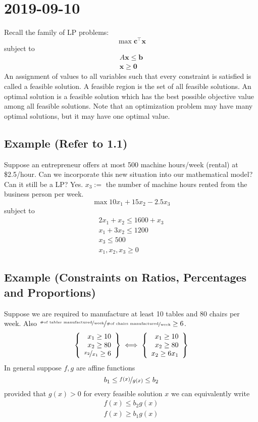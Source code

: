 \section{2019-09-10}
Recall the family of LP problems:
\[\max \mathbf{c}^\top \mathbf{x}\]
subject to
\begin{align*}
    A\mathbf{x}\le \mathbf{b}\\
    \mathbf{x}\ge \mathbf{0}
\end{align*}
An assignment of values to all variables such that every
constraint is satisfied is called a feasible solution.
A feasible region is the set of all feasible solutions.
An optimal solution is a feasible solution which has the best
possible objective value among all feasible solutions.
Note that an optimization problem may have many optimal
solutions, but it may have one optimal value.
\subsection{Example (Refer to 1.1)}
Suppose an entrepreneur offers at most 500 machine hours/week
(rental) at \$2.5/hour. Can we incorporate this new situation
into our mathematical model? Can it still be a LP? Yes.
$x_3:=$ the number of machine hours rented from the business
person per week.
\[\max 10x_1+15x_2-2.5x_3\]
subject to
\begin{align*}
    2x_1+x_2\le 1600+x_3\\
    x_1+3x_2\le 1200\\
    x_3\le 500\\
    x_1,x_2,x_3\ge 0
\end{align*}

\subsection{Example (Constraints on Ratios, Percentages and Proportions)}
Suppose we are required to manufacture at least 10 tables and
80 chairs per week. Also 
$\nicefrac{\nicefrac{\text{\#of tables manufactured}}{\text{week}}}
{\nicefrac{\text{\#of chairs manufactured}}{\text{week}}}
\ge 6$.
\[
   \left\{\begin{array}{r}
        x_1\ge 10\\
        x_2\ge 80\\
        \nicefrac{x_2}{x_1}\ge 6
    \end{array}\right\}
    \iff
    \left\{\begin{array}{r}
        x_1\ge 10\\
        x_2\ge 80\\
        x_2\ge 6x_1
    \end{array}\right\}
\]
In general suppose $f,g$ are affine functions
\[
    b_1\le \nicefrac{f(x)}{g(x)}\le b_2
\]
provided that $g(x)>0$ for every feasible solution $x$ we
can equivalently write
\begin{align*}
    f(x)\le b_2 g(x)\\
    f(x)\ge b_1 g(x)
\end{align*}

